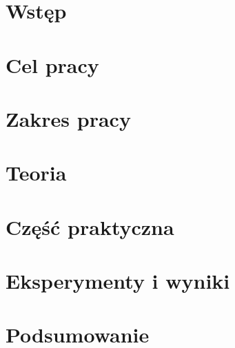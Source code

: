 \documentclass[a4paper, 12pt, titlepage, oneside]{report}
\begin{document}
    
    
    
    

	\tableofcontents
	
	\chapter*{Wstęp}
		\pagebreak
	\chapter*{Cel pracy}
	\chapter*{Zakres pracy}
	\chapter{Teoria}
		\justify
    \chapter{Część praktyczna}
        \justify
    \chapter{Eksperymenty i wyniki}
        \justify
    \chapter*{Podsumowanie}
    \printbibliography
    \pagebreak
    \listoftables
    \listoffigures

    
\end{document}

